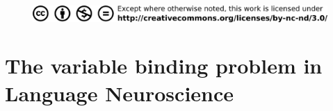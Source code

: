 \documentclass[twoside, justified, notoc, nobib, 
	nohyper]{tufte-book}
\begin{document}
\begin{fullwidth}
\begin{figure}[b]
\begin{center}
\includegraphics{figures/title/creativecommons}
\end{center}
\end{figure}


\end{fullwidth}%
\clearpage\null\newpage


%

%

%

%

\cleardoublepage

\begin{fullwidth}
\tableofcontents
\end{fullwidth}

\begin{fullwidth}
\listoffigures
\end{fullwidth}

\begin{fullwidth}
\listoftables
\end{fullwidth}

%
%
\clearpage\null\newpage

\setcounter{page}{1}
%
\cleardoublepage


\part{The variable binding problem in Language Neuroscience}
\cleardoublepage
%
%
%
%
\end{document}
